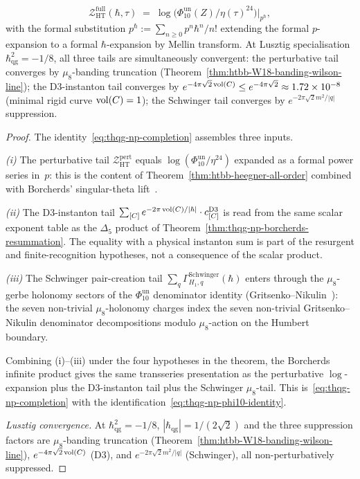 \begin{theorem}
\begin{equation}
 \mathcal{Z}^{\mathrm{full}}_{\mathrm{HT}}(\hbar, \tau)
 \;=\; \log\!\bigl(\Phi_{10}^{\mathrm{un}}(Z)/\eta(\tau)^{24}\bigr)\bigr|_{p^\hbar},
\end{equation}
with the formal substitution $p^\hbar := \sum_{n\geq 0}p^n\hbar^n/n!$
extending the formal $p$-expansion to a formal $\hbar$-expansion by
Mellin transform. At Lusztig specialisation $\hbar_{\mathrm{qg}}^2 =
-1/8$, all three tails are simultaneously convergent: the
perturbative tail converges by $\mu_8$-banding truncation
(Theorem~\ref{thm:htbb-W18-banding-wilson-line}); the D$3$-instanton
tail converges by
$e^{-4\pi\sqrt 2\operatorname{vol}(C)}\leq e^{-4\pi\sqrt 2}\approx 1.72\times 10^{-8}$
(minimal rigid curve $\operatorname{vol}(C) = 1$); the Schwinger tail converges by
$e^{-2\pi\sqrt 2 m^2/|q|}$ suppression.
\end{theorem}

\begin{proof}
The identity~\eqref{eq:thqg-np-completion} assembles three inputs.

\emph{(i)} The perturbative tail
$\mathcal{Z}^{\mathrm{pert}}_{\mathrm{HT}}$ equals
$\log(\Phi_{10}^{\mathrm{un}}/\eta^{24})$ expanded as a formal power series
in~$p$: this is the content of
Theorem~\ref{thm:htbb-heegner-all-order} combined with Borcherds'
singular-theta lift~\cite[Thm.~10.1]{Borcherds1998}.

\emph{(ii)} The D$3$-instanton tail
$\sum_{[C]}e^{-2\pi\operatorname{vol}(C)/|\hbar|}\cdot c^{\mathrm{D3}}_{[C]}$
is read from the same scalar exponent table as the
$\Delta_5$ product of Theorem~\ref{thm:thqg-np-borcherds-resummation}.
The equality with a physical instanton sum is part of the resurgent and
finite-recognition hypotheses, not a consequence of the scalar product.

\emph{(iii)} The Schwinger pair-creation tail
$\sum_q\Gamma^{\mathrm{Schwinger}}_{H_1, q}(\hbar)$ enters through
the $\mu_8$-gerbe holonomy sectors of the $\Phi_{10}^{\mathrm{un}}$ denominator
identity (Gritsenko--Nikulin~\cite[\S 3]{GritsenkoNikulin1998}): the
seven non-trivial $\mu_8$-holonomy charges index the seven non-trivial
Gritsenko--Nikulin denominator decompositions modulo $\mu_8$-action on
the Humbert boundary.

Combining (i)--(iii) under the four hypotheses in the theorem, the
Borcherds infinite product gives the same transseries presentation as
the perturbative $\log$-expansion plus the D$3$-instanton tail plus
the Schwinger $\mu_8$-tail. This is~\eqref{eq:thqg-np-completion}
with the identification~\eqref{eq:thqg-np-phi10-identity}.

\emph{Lusztig convergence.} At $\hbar^2_{\mathrm{qg}} = -1/8$,
$|\hbar_{\mathrm{qg}}| = 1/(2\sqrt 2)$ and the three suppression
factors are $\mu_8$-banding truncation
(Theorem~\ref{thm:htbb-W18-banding-wilson-line}),
$e^{-4\pi\sqrt 2\operatorname{vol}(C)}$ (D$3$), and $e^{-2\pi\sqrt 2 m^2/|q|}$
(Schwinger), all non-perturbatively suppressed.
\end{proof}

